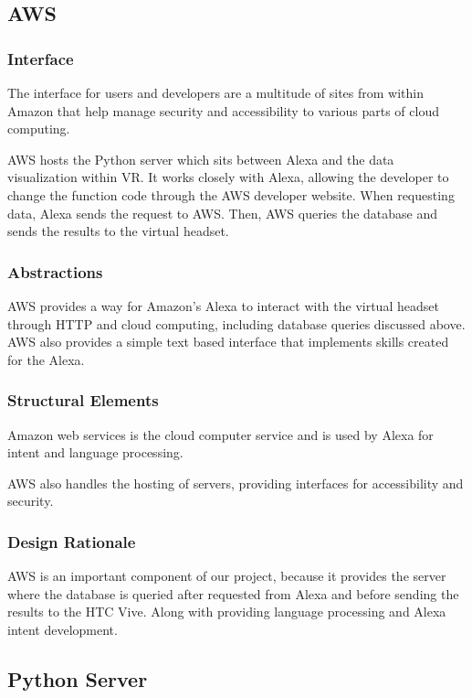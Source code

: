 \documentclass[onecolumn, draftclsnofoot,10pt, compsoc]{IEEEtran}
\begin{document}
    \subsection{AWS}
        \subsubsection{Interface}
            The interface for users and developers are a multitude of sites from within Amazon that help manage security and accessibility to various parts of cloud computing.
            
            AWS hosts the Python server which sits between Alexa and the data visualization within VR. It works closely with Alexa, allowing the developer to change the function code through the AWS developer website. When requesting data, Alexa sends the request to AWS. Then, AWS queries the database and sends the results to the virtual headset.
        
        \subsubsection{Abstractions}
            AWS provides a way for Amazon{'}s Alexa to interact with the virtual headset through HTTP and cloud computing, including database queries discussed above. AWS also provides a simple text based interface that implements skills created for the Alexa.
        
        \subsubsection{Structural Elements}
            Amazon web services is the cloud computer service and is used by Alexa for intent and language processing. 
            
            AWS also handles the hosting of servers, providing interfaces for accessibility and security.
        
        \subsubsection{Design Rationale}
            AWS is an important component of our project, because it provides the server where the database is queried after requested from Alexa and before sending the results to the HTC Vive. Along with providing language processing and Alexa intent development.
        
    \subsection{Python Server}
\end{document}
